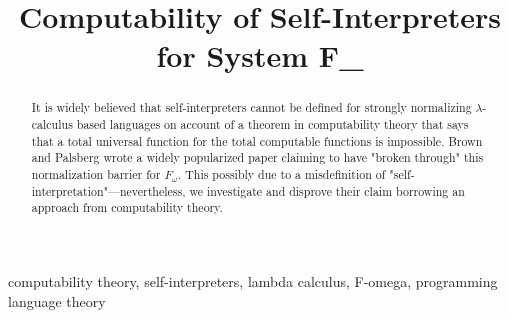\documentclass[conference]{IEEEtran}
\begin{document}
\title{Computability of Self-Interpreters for System F_\omega
}

\author{
\and
{}
\and
{}
}

\maketitle

\begin{abstract}
It is widely believed that self-interpreters cannot be defined for strongly normalizing $\lambda$-calculus based languages on account of a theorem in computability theory that says that a total universal function for the total computable functions is
impossible. Brown and Palsberg wrote a widely popularized paper claiming to have "broken through" this normalization barrier for $F_\omega$. This possibly due to a misdefinition of "self-interpretation"—nevertheless, we investigate and disprove their claim borrowing an approach from computability theory.
\end{abstract}

\begin{IEEEkeywords}
computability theory, self-interpreters, lambda calculus, F-omega, programming language theory
\end{IEEEkeywords}
\end{document}
